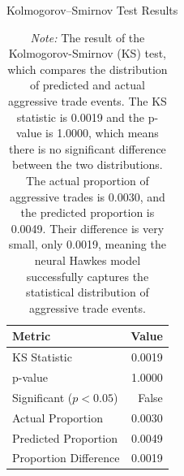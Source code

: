 \begin{table}[H]
    \centering
    \caption{Kolmogorov--Smirnov Test Results}
    \caption*{\textit{Note:} The result of the Kolmogorov-Smirnov (KS) test, which compares the distribution of predicted and actual aggressive trade events. The KS statistic is 0.0019 and the p-value is 1.0000, which means there is no significant difference between the two distributions. The actual proportion of aggressive trades is 0.0030, and the predicted proportion is 0.0049. Their difference is very small, only 0.0019, meaning the neural Hawkes model successfully captures the statistical distribution of aggressive trade events.}
    \label{tb:ks-test}
    \begin{tabular}{lr}
    \toprule
    \textbf{Metric} & \textbf{Value} \\
    \midrule
    KS Statistic & 0.0019 \\
    p-value & 1.0000 \\
    Significant ($p < 0.05$) & False \\
    Actual Proportion & 0.0030 \\
    Predicted Proportion & 0.0049 \\
    Proportion Difference & 0.0019 \\
    \bottomrule
    \end{tabular}
\end{table}




